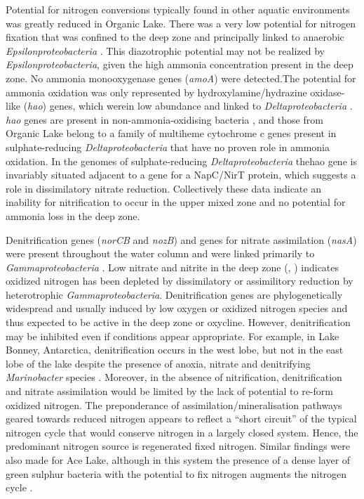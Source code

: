 Potential for nitrogen conversions typically found in other aquatic environments was greatly reduced in Organic Lake. 
There was a very low potential for nitrogen fixation that was confined to the deep zone  and principally linked to anaerobic \emph{Epsilonproteobacteria} . 
This diazotrophic potential may not be realized by \emph{Epsilonproteobacteria}, given the high ammonia concentration present in the deep zone. 
No ammonia monooxygenase genes (\emph{amoA}) were detected.The potential for ammonia oxidation was only represented by hydroxylamine/hydrazine oxidase-like (\emph{hao}) genes, which werein low abundance and linked to \emph{Deltaproteobacteria} . 
\emph{hao} genes are present in non-ammonia-oxidising bacteria \cite{Bergmann2005}, and those from Organic Lake belong to a family of multiheme cytochrome c genes present in sulphate-reducing \emph{Deltaproteobacteria} that have no proven role in ammonia oxidation. 
In the genomes of sulphate-reducing \emph{Deltaproteobacteria} thehao gene is invariably situated adjacent to a gene for a NapC/NirT protein, which suggests a role in dissimilatory nitrate reduction. 
Collectively these data indicate an inability for nitrification to occur in the upper mixed zone and no potential for ammonia loss in the deep zone.

Denitrification genes (\emph{norCB} and \emph{nozB}) and genes for nitrate assimilation (\emph{nasA}) were present throughout the water column  and were linked primarily to \emph{Gammaproteobacteria} . 
Low nitrate and nitrite in the deep zone (, ) indicates oxidized nitrogen has been depleted by dissimilatory or assimilitory reduction by heterotrophic \emph{Gammaproteobacteria}. 
Denitrification genes are phylogenetically widespread and usually induced by low oxygen or oxidized nitrogen species \cite{Kraft2011} and thus expected to be active in the deep zone or oxycline. 
However, denitrification may be inhibited even if conditions appear appropriate. 
For example, in Lake Bonney, Antarctica, denitrification occurs in the west lobe, but not in the east lobe of the lake despite the presence of anoxia, nitrate and denitrifying \emph{Marinobacter} species \cite{Ward1997, Ward2005}.
 Moreover, in the absence of nitrification, denitrification and nitrate assimilation would be limited by the lack of potential to re-form oxidized nitrogen. 
The preponderance of assimilation/mineralisation pathways geared towards reduced nitrogen appears to reflect a ``short circuit'' of the typical nitrogen cycle that would conserve nitrogen in a largely closed system. 
Hence, the predominant nitrogen source is regenerated fixed nitrogen.
Similar findings were also made for Ace Lake, although in this system the presence of a dense layer of green sulphur bacteria with the potential to fix nitrogen augments the nitrogen cycle \cite{Lauro2011}. 

